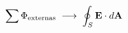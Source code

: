 \documentclass[preview]{standalone}
\begin{document}
\begin{align*}
\special{dvisvgm:raw <g id='unique000'>}\sum\Phi_{\rm externas}\;\longrightarrow\;\oint_S\mathbf E\cdot d\mathbf A\special{dvisvgm:raw </g>}
\end{align*}
\end{document}
